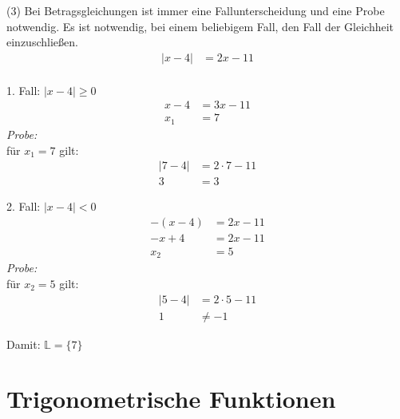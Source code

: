 (3) Bei Betragsgleichungen ist immer eine Fallunterscheidung und eine Probe notwendig. Es ist notwendig, bei einem beliebigem Fall, den Fall der Gleichheit einzuschließen. 
\begin{align*}
    |x - 4| &= 2x - 11 \\
\end{align*}
\begin{minipage}[t]{0.5\textwidth}
    1. Fall: $|x - 4| \geq 0$
    \begin{align*}
        x - 4 &= 3x - 11 \\
        x_1 &= 7
    \end{align*}
    \textit{Probe:} \\
    für $x_1 = 7$ gilt: 
    \begin{align*}
        |7 - 4| &= 2 \cdot 7 - 11 \\
        3 &= 3
    \end{align*}
\end{minipage}
\begin{minipage}[t]{0.5\textwidth}
    2. Fall: $|x - 4| < 0$
    \begin{align*}
        -(x - 4) &= 2x - 11 \\
        -x + 4 &= 2x - 11 \\
        x_2 &= 5
    \end{align*}
    \textit{Probe:}\\
    für $x_2 = 5$ gilt:
    \begin{align*}
        |5 - 4| &= 2 \cdot 5 - 11 \\
        1 &\neq -1
    \end{align*}
\end{minipage}

Damit: $\mathbb{L} = \{7\}$

\section{Trigonometrische Funktionen}

